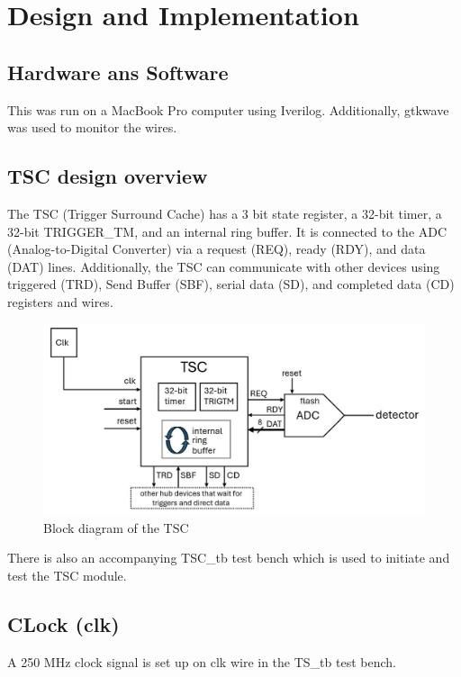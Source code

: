 \section{Design and Implementation }

\subsection{Hardware ans Software}
This was run on a MacBook Pro computer using Iverilog. Additionally, gtkwave was used to monitor the wires.

\subsection{TSC design overview}

The TSC (Trigger Surround Cache) has a 3 bit state register, a 32-bit timer,
a 32-bit TRIGGER\_TM, and an internal ring buffer.
It is connected to the ADC (Analog-to-Digital Converter)
via a request (REQ), ready (RDY), and data (DAT) lines.
Additionally, the TSC can communicate with other devices using triggered (TRD), Send Buffer (SBF),
serial data (SD), and completed data (CD) registers and wires.


\begin{figure}[H]
      \centering
      \includegraphics[width=0.8\columnwidth]{Figures/block_diagram_of_TSC}
      \caption{Block diagram of the TSC}
      \label{fig:block diagram of TSC}
\end{figure}

There is also an accompanying TSC\_tb test bench which is used to initiate and test the TSC module.

\subsection{CLock (clk)}
A 250 MHz clock signal is set up on clk wire in the TS\_tb test bench.

